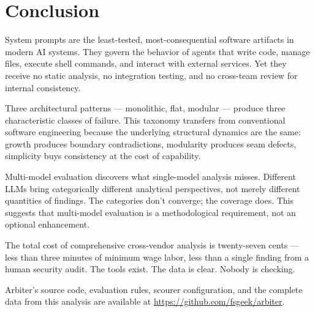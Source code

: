 \section{Conclusion}

System prompts are the least-tested, most-consequential software
artifacts in modern AI systems. They govern the behavior of agents that
write code, manage files, execute shell commands, and interact with
external services. Yet they receive no static analysis, no integration
testing, and no cross-team review for internal consistency.

Three architectural patterns --- monolithic, flat, modular --- produce
three characteristic classes of failure. This taxonomy transfers from
conventional software engineering because the underlying structural
dynamics are the same: growth produces boundary contradictions,
modularity produces seam defects, simplicity buys consistency at the
cost of capability.

Multi-model evaluation discovers what single-model analysis misses.
Different LLMs bring categorically different analytical perspectives,
not merely different quantities of findings. The categories don't
converge; the coverage does. This suggests that multi-model evaluation
is a methodological requirement, not an optional enhancement.

The total cost of comprehensive cross-vendor analysis is twenty-seven
cents --- less than three minutes of minimum wage labor, less than a
single finding from a human security audit. The tools exist. The data is
clear. Nobody is checking.

Arbiter's source code, evaluation rules, scourer configuration, and the
complete data from this analysis are available at
\url{https://github.com/fsgeek/arbiter}.
